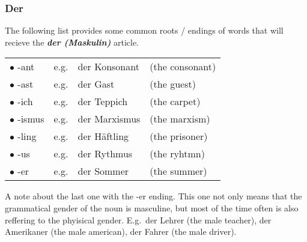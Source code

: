 \documentclass[a4paper,12pt]{article}
\begin{document}
\subsubsection{\bf{Der}}
\begin{adjustwidth}{3em}{0pt}
\label{sec:der}

The following list provides some common roots / endings of words that will
recieve the \textbf{\textit{der (Maskulin)}} article.


\vspace{0.3cm}
\begin{tabular}{l r l l}

\rowcolor{white} $\bullet$ -ant   & e.g. & der Konsonant & (the consonant)\\
\rowcolor{white} $\bullet$ -ast   & e.g. & der Gast      & (the guest)\\
\rowcolor{white} $\bullet$ -ich   & e.g. & der Teppich   & (the carpet)\\
\rowcolor{white} $\bullet$ -ismus & e.g. & der Marxismus & (the marxism)\\
\rowcolor{white} $\bullet$ -ling  & e.g. & der Häftling  & (the prisoner)\\
\rowcolor{white} $\bullet$ -us    & e.g. & der Rythmus   & (the ryhtmn)\\
\rowcolor{white} $\bullet$ -er    & e.g. & der Sommer    & (the summer)\\

\end{tabular}
\vspace{0.3cm}
\newline

A note about the last one with the -er ending. This one not only means that the
grammatical gender of the noun is masculine, but most of the time often is also
reffering to the phyisical gender. E.g.\ der Lehrer (the male teacher), der
Amerikaner (the male american), der Fahrer (the male driver).\\

\end{adjustwidth}

\end{document}
